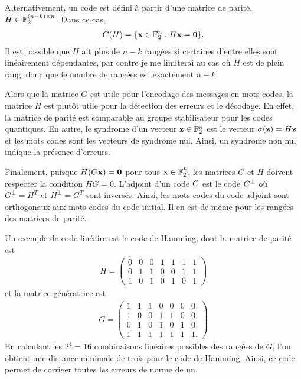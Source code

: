 Alternativement,
un code est défini à partir d'une matrice de parité, $H \in \mathbb{F}_{2}^{(n - k) \times n}$.
Dans ce cas,
\begin{align}
	C(H) = \qty{
		\vb x \in \mathbb{F}_{2}^n : H \vb x = \vb 0
	}.
\end{align}
Il est possible que $H$ ait plus de $n - k$ rangées si certaines d'entre elles 
sont linéairement dépendantes, par contre je me limiterai au cas où $H$ est 
de plein rang, donc que le nombre de rangées est exactement $n - k$.

Alors que la matrice $G$ est utile pour l'encodage des messages en mots codes,
la matrice $H$ est plutôt utile pour la détection des erreurs et le décodage.
En effet,
la matrice de parité est comparable au groupe stabilisateur pour les codes quantiques.
En autre,
le syndrome d'un vecteur $\vb z \in \mathbb{F}_{2}^n$ est le vecteur $\sigma(\vb z) = H\vb z$
et les mots codes sont les vecteurs de syndrome nul.
Ainsi, un syndrome non nul indique la présence d'erreurs.

Finalement, puisque $H (G\vb x) = \vb 0$ pour tous $\vb x \in \mathbb{F}_{2}^k$,
les matrices $G$ et $H$ doivent respecter la condition $HG = 0$.
L'adjoint d'un code $C$ est le code $C^\perp$ où $G^\perp = H^T$ et $H^\perp = G^T$ sont inversés.
Ainsi, les mots codes du code adjoint sont orthogonaux aux mots codes du code initial.
Il en est de même pour les rangées des matrices de parité.

Un exemple de code linéaire est le code de Hamming, dont la matrice
de parité est 
\begin{align}
	H = \begin{pmatrix}
		0 & 0 & 0 & 1 & 1 & 1 & 1 \\
		0 & 1 & 1 & 0 & 0 & 1 & 1 \\
		1 & 0 & 1 & 0 & 1 & 0 & 1
	\end{pmatrix}
\end{align}
et la matrice génératrice est 
\begin{align}
	G = \begin{pmatrix}
		1 & 1 & 1 & 0 & 0 & 0 & 0 \\
		1 & 0 & 0 & 1 & 1 & 0 & 0 \\
		0 & 1 & 0 & 1 & 0 & 1 & 0 \\
		1 & 1 & 1 & 1 & 1 & 1 & 1.
	\end{pmatrix}
\end{align}
En calculant les $2^4 = 16$ combinaisons linéaires possibles des 
rangées de $G$,
l'on obtient une distance minimale de trois pour le code de Hamming.
Ainsi,
ce code permet de corriger toutes les erreurs de norme de un.

